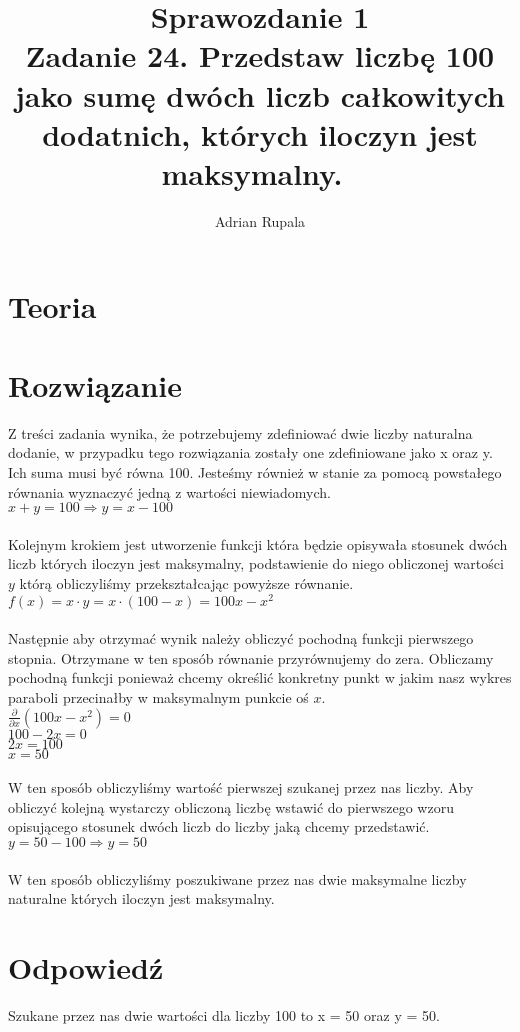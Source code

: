 \documentclass[UTF8]{article}
\title{%
	Sprawozdanie 1 \\
	\large Zadanie 24. Przedstaw liczbę 100 jako sumę dwóch liczb całkowitych dodatnich, których iloczyn jest maksymalny.~}
\author{Adrian Rupala}
\begin{document}
\maketitle

\newpage
\tableofcontents

\newpage
{}

\section{Teoria}



\section{Rozwiązanie}

Z treści zadania wynika, że potrzebujemy zdefiniować dwie liczby naturalna dodanie, w przypadku tego rozwiązania zostały one zdefiniowane jako x oraz y. Ich suma musi być równa 100. Jesteśmy również w stanie za pomocą powstałego równania wyznaczyć jedną z wartości niewiadomych. ~
\\$x + y = 100 \Rightarrow y = x - 100 $\\
\\Kolejnym krokiem jest utworzenie funkcji która będzie opisywała stosunek dwóch liczb których iloczyn jest maksymalny, podstawienie do niego obliczonej wartości $y$ którą obliczyliśmy przekształcając powyższe równanie.~
\\$ f(x) = x \cdot y = x \cdot (100-x) = 100x - x^{2} $\\
\\Następnie aby otrzymać wynik należy obliczyć pochodną funkcji pierwszego stopnia. Otrzymane w ten sposób równanie przyrównujemy do zera. Obliczamy pochodną funkcji  ponieważ chcemy określić konkretny punkt w jakim nasz wykres paraboli przecinałby w maksymalnym punkcie oś $ x $.~
\\$ \frac{\partial}{\partial x}(100x - x^{2}) = 0$
\\$100 - 2x = 0$
\\$2x = 100$
\\$x = 50 $\\
\\W ten sposób obliczyliśmy wartość pierwszej szukanej przez nas liczby. Aby obliczyć kolejną wystarczy obliczoną liczbę wstawić do pierwszego wzoru opisującego stosunek dwóch liczb do liczby jaką chcemy przedstawić.~
\\$ y = 50 - 100 \Rightarrow y = 50 $\\
\\W ten sposób obliczyliśmy poszukiwane przez nas dwie maksymalne liczby naturalne których iloczyn jest maksymalny.~

\section{Odpowiedź}

	Szukane przez nas dwie wartości dla liczby 100 to x = 50 oraz y = 50. ~
\end{document}
